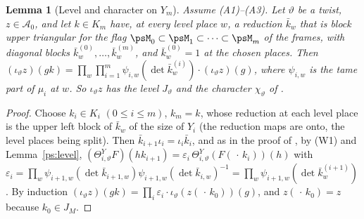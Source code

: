 \documentclass[10pt]{amsart}
\newtheorem{lemma}[theorem]{Lemma}
\theoremstyle{definition}
\theoremstyle{remark}
\providecommand{\auAz}{\mathcal A_0}
\begin{document}
\begin{lemma}[Level and character on $Y_m$]\label{pz:lastlevel}
Assume {\rm(A1)--(A3)}. Let $\vartheta$ be a twist, $z\in\auAz$, and let $k\in K_m$ have, at every
level place $w$, a reduction $\bar k_w$ that is block upper triangular for the flag
$\psM_0\subset\psM_1\subset\dots\subset\psM_m$ of the frames, with diagonal blocks
$\bar k_w^{(0)},\dots,\bar k_w^{(m)}$, and $\bar k_w^{(0)}=1$ at the chosen places. Then
$(\iota_\vartheta z)(gk)=\prod_w\prod_{i=1}^m\psi_{i,w}(\det\bar k_w^{(i)})\cdot(\iota_\vartheta z)(g)$,
where $\psi_{i,w}$ is the tame part of $\mu_i$ at $w$. So $\iota_\vartheta z$ has the level
$J_\vartheta$ and the character $\chi_\vartheta$ of {\cite[\S14.3]{P46}}.
\end{lemma}
\begin{proof}
Choose $k_i\in K_i$ $(0\le i\le m)$, $k_m=k$, whose reduction at each level place is the upper
left block of $\bar k_w$ of the size of $Y_i$ (the reduction maps are onto, the level places being
split). Then $\bar k_{i+1}\iota_i=\iota_i\bar k_i$, and as in the proof of
{\cite[Proposition~14.27]{P46}}, by (W1) and Lemma~\ref{ps:level},
$(\Theta^Y_{i,\vartheta}F)(hk_{i+1})=\varepsilon_i\,\Theta^Y_{i,\vartheta}(F(\,\cdot\,k_i))(h)$ with
$\varepsilon_i=\prod_w\psi_{i+1,w}(\det\bar k_{i+1,w})\psi_{i+1,w}(\det\bar k_{i,w})^{-1}=\prod_w
\psi_{i+1,w}(\det\bar k_w^{(i+1)})$. By induction $(\iota_\vartheta z)(gk)=\prod_i\varepsilon_i\cdot
\iota_\vartheta(z(\,\cdot\,k_0))(g)$, and $z(\,\cdot\,k_0)=z$ because $k_0\in J_M$.
\end{proof}
\end{document}

